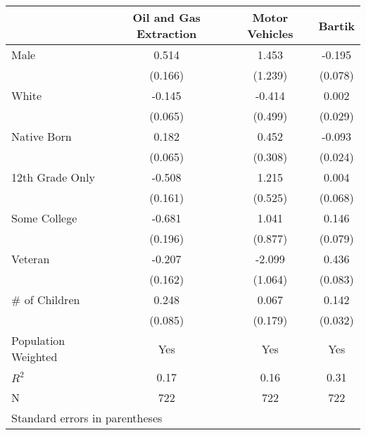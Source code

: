 \begin{tabular}{l*{3}{c}}
\toprule
                &\multicolumn{1}{c}{Oil and Gas Extraction}&\multicolumn{1}{c}{Motor Vehicles}&\multicolumn{1}{c}{Bartik}\\
\midrule
Male            &    0.514&    1.453&   -0.195\\
                &  (0.166)&  (1.239)&  (0.078)\\
White           &   -0.145&   -0.414&    0.002\\
                &  (0.065)&  (0.499)&  (0.029)\\
Native Born     &    0.182&    0.452&   -0.093\\
                &  (0.065)&  (0.308)&  (0.024)\\
12th Grade Only &   -0.508&    1.215&    0.004\\
                &  (0.161)&  (0.525)&  (0.068)\\
Some College    &   -0.681&    1.041&    0.146\\
                &  (0.196)&  (0.877)&  (0.079)\\
Veteran         &   -0.207&   -2.099&    0.436\\
                &  (0.162)&  (1.064)&  (0.083)\\
\# of Children  &    0.248&    0.067&    0.142\\
                &  (0.085)&  (0.179)&  (0.032)\\
\midrule
Population Weighted&      Yes&      Yes&      Yes\\
$ R^2$          &     0.17&     0.16&     0.31\\
N               &      722&      722&      722\\
\bottomrule
\multicolumn{4}{l}{\footnotesize Standard errors in parentheses}\\
\end{tabular}
